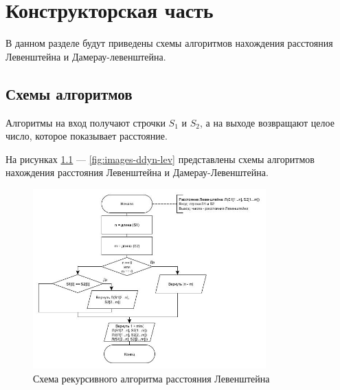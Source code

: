 \chapter{Конструкторская часть}
В данном разделе будут приведены схемы алгоритмов нахождения расстояния Левенштейна и
Дамерау-левенштейна.

\section{Схемы алгоритмов}

Алгоритмы на вход получают строчки $S_1$ и $S_2$, а на выходе возвращают целое число,
которое показывает расстояние.

На рисунках \ref{fig:images-rec-lev} --- \ref{fig:images-ddyn-lev}
представлены схемы алгоритмов нахождения расстояния Левенштейна и Дамерау-Левенштейна.

\begin{figure}[h]
    \centering
    \includegraphics[width=0.8\textwidth]{images/lev_rec.jpg}
    \caption{Схема рекурсивного алгоритма расстояния Левенштейна}
    \label{fig:images-rec-lev}
\end{figure}

